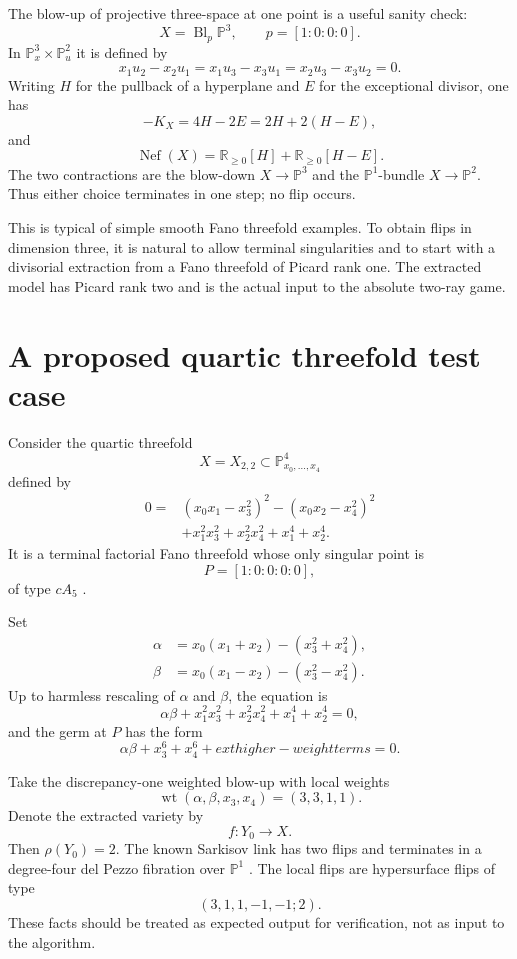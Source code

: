 \documentclass[11pt]{article}
\newcommand{\Nef}{\operatorname{Nef}}
\begin{document}
The blow-up of projective three-space at one point is a useful sanity check:
\[
  X=\operatorname{Bl}_p\mathbb P^3,
  \qquad p=[1:0:0:0].
\]
In $\mathbb P^3_x\times\mathbb P^2_u$ it is defined by
\[
  x_1u_2-x_2u_1=x_1u_3-x_3u_1=x_2u_3-x_3u_2=0.
\]
Writing $H$ for the pullback of a hyperplane and $E$ for the exceptional
divisor, one has
\[
  -K_X=4H-2E=2H+2(H-E),
\]
and
\[
  \Nef(X)=\mathbb R_{\geq0}[H]
           +\mathbb R_{\geq0}[H-E].
\]
The two contractions are the blow-down $X\to\mathbb P^3$ and the
$\mathbb P^1$-bundle $X\to\mathbb P^2$.  Thus either choice terminates in one
step; no flip occurs.

This is typical of simple smooth Fano threefold examples.  To obtain flips in
dimension three, it is natural to allow terminal singularities and to start
with a divisorial extraction from a Fano threefold of Picard rank one.  The
extracted model has Picard rank two and is the actual input to the absolute
two-ray game.

\section{A proposed quartic threefold test case}

Consider the quartic threefold
\[
  X=X_{2,2}\subset\mathbb P^4_{x_0,\ldots,x_4}
\]
defined by
\begin{align*}
0={}&(x_0x_1-x_3^2)^2-(x_0x_2-x_4^2)^2\\
   &+x_1^2x_3^2+x_2^2x_4^2+x_1^4+x_2^4.
\end{align*}
It is a terminal factorial Fano threefold whose only singular point is
\[
  P=[1:0:0:0:0],
\]
of type $cA_5$ \cite{AK}.

Set
\begin{align*}
  \alpha&=x_0(x_1+x_2)-(x_3^2+x_4^2),\\
  \beta &=x_0(x_1-x_2)-(x_3^2-x_4^2).
\end{align*}
Up to harmless rescaling of $\alpha$ and $\beta$, the equation is
\[
  \alpha\beta+x_1^2x_3^2+x_2^2x_4^2+x_1^4+x_2^4=0,
\]
and the germ at $P$ has the form
\[
  \alpha\beta+x_3^6+x_4^6+	ext{higher-weight terms}=0.
\]

Take the discrepancy-one weighted blow-up with local weights
\[
  \operatorname{wt}(\alpha,\beta,x_3,x_4)=(3,3,1,1).
\]
Denote the extracted variety by
\[
  f\colon Y_0\longrightarrow X.
\]
Then $\rho(Y_0)=2$.  The known Sarkisov link has two flips and terminates in a
degree-four del Pezzo fibration over $\mathbb P^1$ \cite{AK}.  The local flips
are hypersurface flips of type
\[
  (3,1,1,-1,-1;2).
\]
These facts should be treated as expected output for verification, not as
input to the algorithm.
\end{document}
